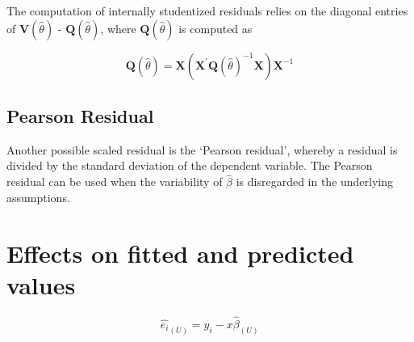 \documentclass[Main.tex]{subfiles}
\begin{document}
The computation of internally studentized residuals relies on the diagonal entries of $\boldsymbol{V} (\hat{\theta})$ - $\boldsymbol{Q} (\hat{\theta})$, where $\boldsymbol{Q} (\hat{\theta})$ is computed as

\[ \boldsymbol{Q} (\hat{\theta}) = \boldsymbol{X} ( \boldsymbol{X}^{\prime}\boldsymbol{Q} (\hat{\theta})^{-1}\boldsymbol{X})\boldsymbol{X}^{-1} \]

\subsection{Pearson Residual}%

Another possible scaled residual is the  `Pearson residual', whereby a residual is divided by the standard deviation of the dependent variable. The Pearson residual can be used when the variability of $\hat{\beta}$ is disregarded in the underlying assumptions.



\section{Effects on fitted and predicted values}
\begin{equation}
\hat{e_{i}}_{(U)} = y_{i} - x\hat{\beta}_{(U)}
\end{equation}





	
	
	
	
	
	
	
\end{document}
